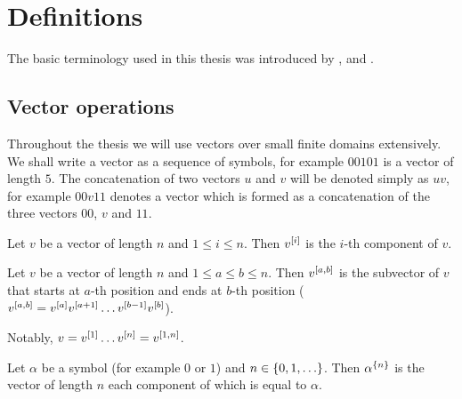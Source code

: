 \chapter{Definitions}

The basic terminology used in this thesis
was introduced by \citet{Schieber2005154},
\citet{Dubovsky2012}
and \citet{Husek2014, Husek2015}.

\section{Vector operations}

Throughout the thesis we will use vectors
over small finite domains extensively.
We shall write a vector as a sequence of symbols,
for example $00101$ is a vector of length $5$.
The concatenation of two vectors $u$ and $v$
will be denoted simply as $uv$,
for example $00v11$ denotes a vector
which is formed as a concatenation
of the three vectors $00$, $v$ and $11$.

\begin{definition}
Let $v$ be a vector of length $n$ and $1 \leq i \leq n$.
Then $v^{[i]}$ is the $i$-th component of $v$.
\end{definition}

\begin{definition}
Let
$v$ be a vector of length $n$
and
$1 \leq a \leq b \leq n$.
Then $v^{[a, b]}$ is the subvector of $v$
that starts at $a$-th position
and ends at $b$-th position
($v^{[a, b]}
= v^{[a]} v^{[a+1]}
\ldots v^{[b-1]} v^{[b]}$).
\end{definition}

Notably,
$v = v^{[1]} \ldots v^{[n]} = v^{[1, n]}$.

\begin{definition}
Let $\alpha$ be a symbol (for example $0$ or $1$)
and $n \in \{0, 1, \ldots\}$.
Then $\alpha^{\{n\}}$ is the vector of length $n$
each component of which is equal to $\alpha$.
\end{definition}

